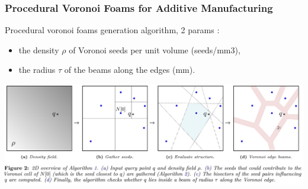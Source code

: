 
\frame
{
	\frametitle{Procedural Voronoi Foams for Additive Manufacturing}
	
	
	
	
	Procedural voronoi foams generation algorithm, 2 params : 
	\begin{itemize}
		\item the density $\rho$ of Voronoi seeds per unit volume (seeds/mm3), 
		\item the radius $\tau$ of the beams along the edges (mm).
	\end{itemize}
	
	\includegraphics[width=\textwidth]{img/voronoi/algovoronoi.png}
	
}


